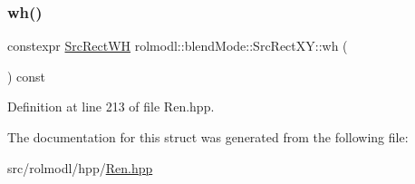 \subsubsection{\texorpdfstring{wh()}{wh()}}
{\footnotesize\ttfamily constexpr \mbox{\hyperlink{structrolmodl_1_1blend_mode_1_1_src_rect_w_h}{Src\+Rect\+WH}} rolmodl\+::blend\+Mode\+::\+Src\+Rect\+X\+Y\+::wh (\begin{DoxyParamCaption}{ }\end{DoxyParamCaption}) const\hspace{0.3cm}{\ttfamily [noexcept]}}



Definition at line 213 of file Ren.\+hpp.



The documentation for this struct was generated from the following file\+:\begin{DoxyCompactItemize}
\item 
src/rolmodl/hpp/\mbox{\hyperlink{_ren_8hpp}{Ren.\+hpp}}\end{DoxyCompactItemize}
